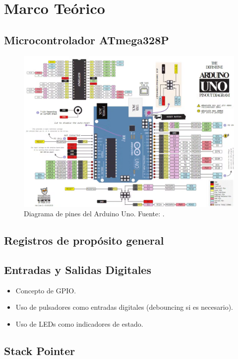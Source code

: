 \section{Marco Teórico}

\subsection{Microcontrolador ATmega328P}

\begin{figure}[H]
  \centering
  \includegraphics[width=\linewidth]{./Anexos/Full Arduino Pinout.png}
  \caption{Diagrama de pines del Arduino Uno. Fuente: \cite{arduino_uno_pinout}.}
  \label{fig:arduino-uno-pinout}
\end{figure}

\subsection{Registros de propósito general}

\subsection{Entradas y Salidas Digitales}
\begin{itemize}
    \item Concepto de GPIO.
    \item Uso de pulsadores como entradas digitales (debouncing si es necesario).
    \item Uso de LEDs como indicadores de estado.
\end{itemize}


\subsection{Stack Pointer}

